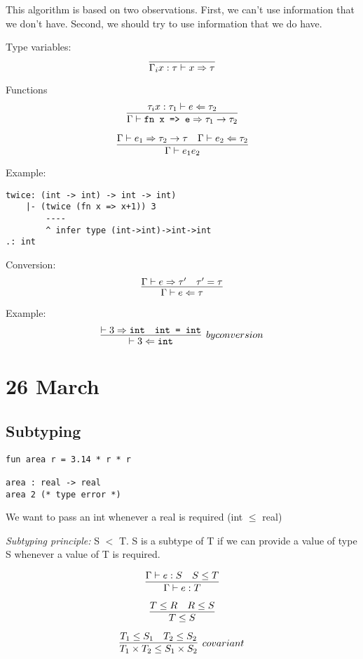 \documentclass[11pt]{article}
\begin{document}
This algorithm is based on two observations. First, we can't use information that we don't have. Second, we should try to use information that we do have. 

Type variables:
\[
    \infer{\Gamma_i x : \tau \vdash x \Rightarrow \tau}{}
\]

Functions
\[
    \infer{\Gamma \vdash \verb~fn x => e~ \Rightarrow \tau_1 \rightarrow \tau_2}{
        \tau_i x : \tau_1 \vdash e \Leftarrow \tau_2
    }
\]

\[
    \infer{\Gamma \vdash e_1 e_2}{
        \Gamma \vdash e_1 \Rightarrow \tau_2 \rightarrow \tau
        &
        \Gamma \vdash e_2 \Leftarrow \tau_2
    }
\]

Example:
\begin{verbatim}
twice: (int -> int) -> int -> int)
    |- (twice (fn x => x+1)) 3
        ----
        ^ infer type (int->int)->int->int
.: int
\end{verbatim}

Conversion:
\[
    \infer{\Gamma \vdash e \Leftarrow \tau}{
        \Gamma \vdash e \Rightarrow \tau^{\prime}
        &
        \tau^{\prime} = \tau
    }
\]

Example:
\[
    \infer[by conversion]{\vdash 3 \Leftarrow \verb~int~}{
        \vdash 3 \Rightarrow \verb~int~
        &
        \verb~int = int~
    }
\]

\section{26 March}
\subsection{Subtyping}
\begin{verbatim}
fun area r = 3.14 * r * r

area : real -> real
area 2 (* type error *)
\end{verbatim}

We want to pass an int whenever a real is required (int $\leq$ real)

\emph{Subtyping principle:} S $<$ T. S is a subtype of T if we can provide a value of type S whenever a value of T is required.

\[
    \infer{\Gamma \vdash e : T}{
        \Gamma \vdash e : S
        &
        S \leq T
    }
\]

\[
    \infer{T \leq S}{
        T \leq R
        &
        R \leq S
    }
\]

\[
    \infer[covariant]{T_1 \times T_2 \leq S_1 \times S_2}{
        T_1 \leq S_1
        &
        T_2 \leq S_2
    }
\]
\end{document}

